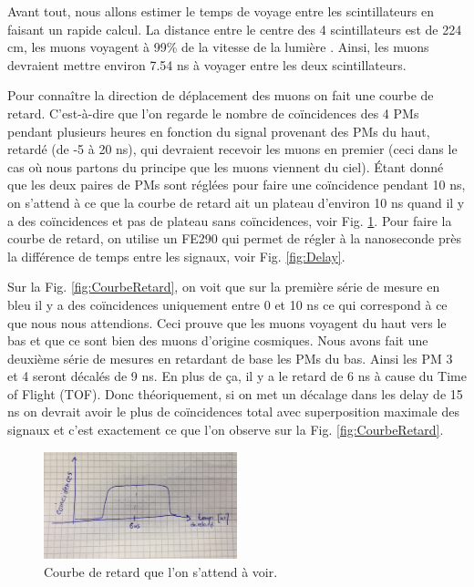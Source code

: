 \documentclass[12pt]{article}
\begin{document}
Avant tout, nous allons estimer le temps de voyage entre les scintillateurs en faisant un rapide calcul. La distance entre le centre des 4 scintillateurs est de 224 cm, les muons voyagent à 99\% de la vitesse de la lumière \cite{vest_measuring_2010}. Ainsi, les muons devraient mettre environ 7.54 ns à voyager entre les deux scintillateurs.

Pour connaître la direction de déplacement des muons on fait une courbe de retard. C'est-à-dire que l'on regarde le nombre de coïncidences des 4 PMs pendant plusieurs heures en fonction du signal provenant des PMs du haut, retardé (de -5 à 20 ns), qui devraient recevoir les muons en premier (ceci dans le cas où nous partons du principe que les muons viennent du ciel). Étant donné que les deux paires de PMs sont réglées pour faire une coïncidence pendant 10 ns, on s'attend à ce que la courbe de retard ait un plateau d'environ 10 ns quand il y a des coïncidences et pas de plateau sans coïncidences, voir Fig. \ref{fig:Schema_Courbe_de_retard}. Pour faire la courbe de retard, on utilise un FE290 qui permet de régler à la nanoseconde près la différence de temps entre les signaux, voir Fig. \ref{fig:Delay}.

Sur la Fig. \ref{fig:CourbeRetard}, on voit que sur la première série de mesure en bleu il y a des coïncidences uniquement entre 0 et 10 ns ce qui correspond à ce que nous nous attendions. Ceci prouve que les muons voyagent du haut vers le bas et que ce sont bien des muons d'origine cosmiques. Nous avons fait une deuxième série de mesures en retardant de base les PMs du bas. Ainsi les PM 3 et 4 seront décalés de 9 ns. En plus de ça, il y a le retard de 6 ns à cause du Time of Flight (TOF). Donc théoriquement, si on met un décalage dans les delay de 15 ns on devrait avoir le plus de coïncidences total avec superposition maximale des signaux et c'est exactement ce que l'on observe sur la Fig. \ref{fig:CourbeRetard}.


\begin{figure}[htpb!]
    \centering
    \includegraphics[width=0.5\textwidth]{Images/Schemas/CourbeDeRetard.jpg}
    \captionsetup{width=0.8\textwidth}
    \caption{Courbe de retard que l'on s'attend à voir.}
    \label{fig:Schema_Courbe_de_retard}
\end{figure}
\end{document}
